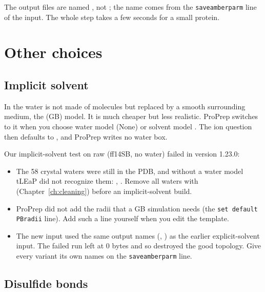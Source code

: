 \medskip
The output files are named , not ; the name comes
from the \texttt{saveamberparm} line of the input. The whole step takes a few
seconds for a small protein.

\section{Other choices}

\subsection{Implicit solvent}\label{sec:topology-implicit}

In  the water is not made of molecules but replaced by
a smooth surrounding medium, the  (GB) model. It is
much cheaper but less realistic. ProPrep switches to it when you choose water
model  (None) or solvent model . The ion question then defaults
to , and ProPrep writes no water box.

\begin{watchout}
Our implicit-solvent test on raw  (ff14SB, no water) failed in
version 1.23.0:
\begin{itemize}
  \item The 58 crystal waters were still in the PDB, and without a water
        model tLEaP did not recognize them: , . Remove all waters with
         (Chapter~\ref{ch:cleaning}) before an implicit-solvent build.
  \item ProPrep did not add the radii that a GB simulation needs (the
        \texttt{set default PBradii} line). Add such a line yourself when you
        edit the template.
  \item The new input used the same output names (,
        ) as the earlier explicit-solvent input. The failed
        run left  at 0 bytes and so destroyed the good
        topology. Give every variant its own names on the
        \texttt{saveamberparm} line.
\end{itemize}
\end{watchout}

\subsection{Disulfide bonds}\label{sec:topology-disulfide}

